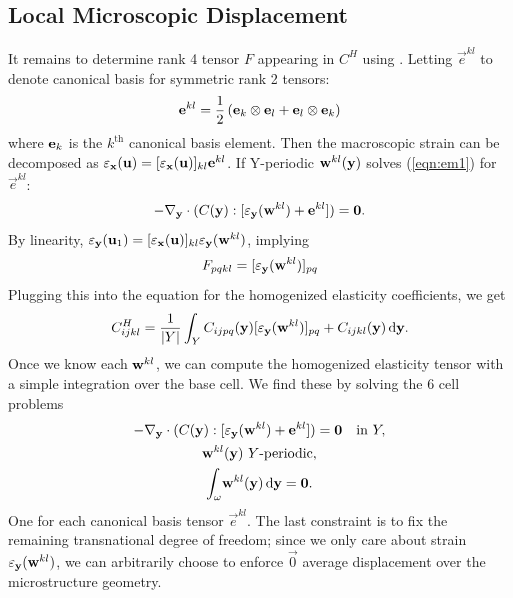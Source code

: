 \documentclass[twocolumn,10pt]{article}
\begin{document}
\subsection{Local Microscopic Displacement}
It remains to determine rank 4 tensor $F$ appearing in $C^H$ using
. Letting $\vec{e}^{kl}$ to denote canonical basis for
symmetric rank 2 tensors:
\[
\vec{e}^{kl} = \frac{1}{2} \left({\bf e}_k \otimes {\bf e}_l + {\bf
  e}_l \otimes {\bf e}_k \right)
\]
where ${\bf e}_k$ is the $k^\text{th}$ canonical basis element. Then
the macroscopic strain can be decomposed as $\strain_{\x}({\bf u}) =
[\strain_{\x}({\bf u})]_{kl}\vec{e}^{kl}$. If Y-periodic ${\bf
  w}^{kl}({\y})$ solves (\ref{eqn:em1}) for $\vec{e}^{kl}$:
\begin{equation}
-\nabla_{\y} \cdot (C(\y): [\strain_\y({\bf w}^{kl}) +
  \vec{e}^{kl}]) = \vec{0}.
\end{equation}
By linearity, $\strain_\y(\u_1) =
[\strain_\x(\u)]_{kl}\strain_\y(\vec{w}^{kl})$, implying
\begin{equation}
F_{pqkl} = [\strain_{\y}({\bf w}^{kl})]_{pq}
\end{equation}
Plugging this into the equation for the homogenized elasticity
coefficients, we get
\begin{equation}
    \label{eqn:Eh}
    C^H_{ijkl}= \frac{1}{|Y|} \int_Y C_{ijpq}({\y}) [\strain_{\y}({\bf
        w}^{kl})]_{pq} + C_{ijkl}({\y}) \, \mathrm{d} {\y}.
\end{equation}
Once we know each ${\bf w}^{kl}$, we can compute the homogenized
elasticity tensor with a simple integration over the base cell. We
find these by solving the 6 cell problems
\begin{subequations}
  \begin{gather}
    -\nabla_{\y} \cdot (C(\y):[\strain_\y(\vec{w}^{kl}) + \vec{e}^{kl}]) = \vec{0} \quad \text{in } Y, \\
    \vec{w}^{kl}(\y)\ Y \text{-periodic}, \\
    \int_\omega \! \vec{w}^{kl}(\y) \, \mathrm{d} {\y} =  \vec{0}.
  \end{gather}
\end{subequations}
One for each canonical basis tensor $\vec{e}^{kl}$. The last
constraint is to fix the remaining transnational degree of freedom;
since we only care about strain $\strain_{\y}({\bf w}^{kl})$, we can
arbitrarily choose to enforce $\vec{0}$ average displacement over the
microstructure geometry.



\end{document}
